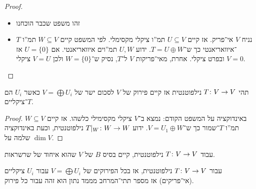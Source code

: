 \documentclass[name=רשימות אלגברה לינארית 2א]{../../../tex/classes/megasumPreamble}
\begin{document}
	\begin{proof}\,
		\begin{itemize}
			\item[$\implies$]זהו משפט שכבר הוכחנו
			\item[$\impliedby$]נניח $V$ אי־פריק. אז קיים $U \subseteq V$ תמ''ו ציקלי מקסימלי. לפי המשפט קיים $W \subseteq V$ תמ''ו $T$־איוואריאנטי כך ש־$T = U \oplus W$. ידוע $U, W$ תמ''וים איוואריאנטי. אם $U = \{0\}$ אז $V = 0$ ובפרט ציקלי. אחרת, מאי־פריקות $V$ ל־$T$, נסיק ש־$W = \{0\}$ ולכן $V = U$ ציקלי. 
		\end{itemize}\envendproof
	\end{proof}
	
	\begin{Theorem}
		תהי $T \colon V \to V$ נילפוטנטית אז קיים פירוק של $V$ לסכום ישר של $V = \bigoplus U_i$ כאשר $U_i$ הם $T$־ציקליים. 
	\end{Theorem}
	\begin{proof}
		באינדוקציה על המשפט הקודם: נמצא ב־$V$ ציקלי מקסימילי כלשהו. אז קיים $W \subseteq V$ תמ''ו $T$־שמור כך ש־$V = U_1 \oplus W$. ידוע $T|_{W} \colon W \to W$ נילפוטנטית, וכעת באינדוקציה שלמה על $\dim V$. 
	\end{proof}
	
	\begin{Theorem}
		עבוד $T \colon V \to V$ נילפוטנטית, קיים בסיס $B$ של $V$ שהוא איחוד של שרשראות. 
	\end{Theorem}
	
	\begin{Theorem}
		עבור $T \colon V \to V$ נילפוטנטית, אז בכל הפירוקים של $V = \bigoplus U_i$ עבור $U_i$ ציקליים (אי־פריקים) אז מספר תתי־המרחב מממד נתון הוא זהה עבור כל פירוק. 
	\end{Theorem}
	
\end{document}
